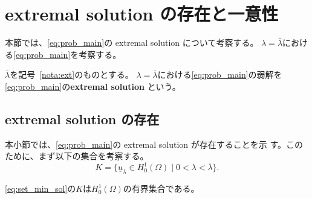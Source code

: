 \section{extremal solution の存在と一意性}

本節では、\ref{eq:prob_main}の extremal solution について考察する。
$\lambda = \bar{\lambda}$における\ref{eq:prob_main}を考察する。

\begin{defn}
 $\bar{\lambda}$を記号~\ref{nota:ext}のものとする。
 $\lambda = \bar{\lambda}$における\ref{eq:prob_main}の弱解を
 \ref{eq:prob_main}の{\bf extremal solution }という。
\end{defn}

\subsection{extremal solution の存在}

本小節では、\ref{eq:prob_main}の extremal solution が存在することを示
す。このために、まず以下の集合を考察する。
\begin{equation}
 K = \{ \underline{u}_\lambda \in H_0^1(\Omega) \mid 0 < \lambda <
  \bar{\lambda} \}.
  \label{eq:set_min_sol}
\end{equation}

\begin{lem} \label{lem:set_min_sol}
 \eqref{eq:set_min_sol}の$K$は$H_0^1(\Omega)$の有界集合である。
\end{lem}

